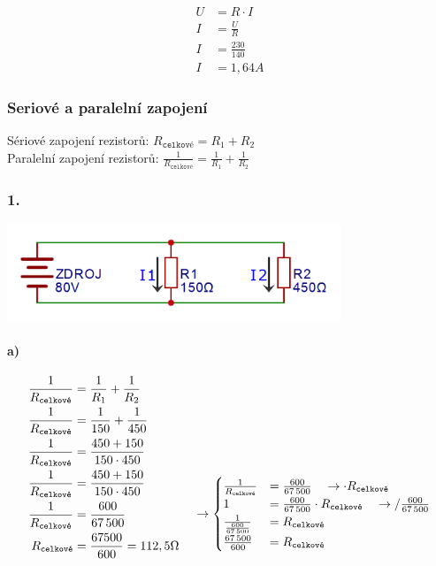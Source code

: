 \documentclass[12pt]{article}
\begin{document}
\begin{equation}
\begin{split}
\nonumber
U &= R\cdot I\\
I &= \frac{U}{R}\\
I &= \frac{230}{140}\\
I &= 1,64A
\end{split}
\end{equation}

\subsubsection{Seriové a paralelní zapojení}
Sériové zapojení rezistorů:
$R_{\texttt{celkové}}=R_1+R_2$\\
Paralelní zapojení rezistorů:
$\frac{1}{R_{\texttt{celkové}}}=\frac{1}{R_1}+\frac{1}{R_2}$

\subsubsection*{1.}
\includegraphics[width=10cm]{Ohm_001.png}
\paragraph{a)}
\begin{equation}
\begin{split}
\nonumber
\frac{1}{R_{\texttt{celkové}}}&=\frac{1}{R_1}+\frac{1}{R_2}\\
\frac{1}{R_{\texttt{celkové}}}&=\frac{1}{150}+\frac{1}{450}\\
\frac{1}{R_{\texttt{celkové}}}&=\frac{450+150}{150\cdot 450}\\
\frac{1}{R_{\texttt{celkové}}}&=\frac{450+150}{150\cdot 450}\\
\frac{1}{R_{\texttt{celkové}}}&=\frac{600}{67\, 500}\\
R_{\texttt{celkové}}&=\frac{67500}{600} = 112,5\Omega
\end{split}
\hspace{0,5cm}
\begin{split}
\nonumber
\\[4\baselineskip]
\rightarrow
\begin{cases}
\frac{1}{R_{\texttt{celkové}}}&=\frac{600}{67\, 500}\quad \rightarrow \cdot R_{\texttt{celkové}}\\
1&=\frac{600}{67\, 500}\cdot R_{\texttt{celkové}}\quad \rightarrow /\frac{600}{67\, 500}\\
\frac{1}{\frac{600}{67\, 500}}&=R_{\texttt{celkové}}\\
\frac{67\, 500}{600}&=R_{\texttt{celkové}}
\end{cases}
\end{split}
\end{equation}
\end{document}
